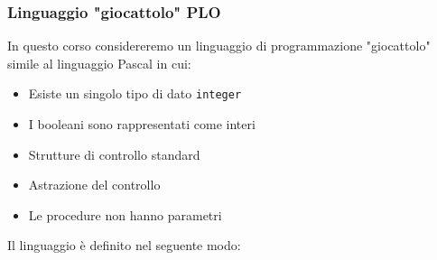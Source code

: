 \documentclass[a4paper]{article}
\begin{document}
\subsubsection{Linguaggio "giocattolo" PLO}
In questo corso considereremo un linguaggio di programmazione "giocattolo" 
simile al linguaggio Pascal in cui:
\begin{itemize}
  \item Esiste un singolo tipo di dato \texttt{integer}
  \item I booleani sono rappresentati come interi
  \item Strutture di controllo standard
  \item Astrazione del controllo
  \item Le procedure non hanno parametri
\end{itemize}
Il linguaggio è definito nel seguente modo:
\end{document}
